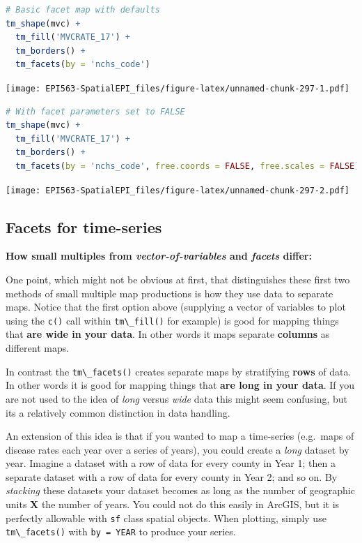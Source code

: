 \documentclass[
]{book}
\newcommand{\passthrough}[1]{#1}
\begin{document}
\begin{lstlisting}[language=R]
# Basic facet map with defaults
tm_shape(mvc) +
  tm_fill('MVCRATE_17') +
  tm_borders() +
  tm_facets(by = 'nchs_code')
\end{lstlisting}

\texttt{[image: EPI563-SpatialEPI\_files/figure-latex/unnamed-chunk-297-1.pdf]}

\begin{lstlisting}[language=R]
# With facet parameters set to FALSE
tm_shape(mvc) +
  tm_fill('MVCRATE_17') +
  tm_borders() +
  tm_facets(by = 'nchs_code', free.coords = FALSE, free.scales = FALSE)
\end{lstlisting}

\texttt{[image: EPI563-SpatialEPI\_files/figure-latex/unnamed-chunk-297-2.pdf]}

\hypertarget{facets-for-time-series}{%
\subsection{Facets for time-series}\label{facets-for-time-series}}

\textbf{How small multiples from \emph{vector-of-variables} and \emph{facets} differ:}

One point, which might not be obvious at first, that distinguishes these first two methods of small multiple map productions is how they use data to separate maps. Notice that the first option above (supplying a vector of variables to plot using the \passthrough{\lstinline!c()!} call within \passthrough{\lstinline!tm\_fill()!} for example) is good for mapping things that \textbf{are wide in your data}. In other words it maps separate \textbf{columns} as different maps.

In contrast the \passthrough{\lstinline!tm\_facets()!} creates separate maps by stratifying \textbf{rows} of data. In other words it is good for mapping things that \textbf{are long in your data}. If you are not used to the idea of \emph{long} versus \emph{wide} data this might seem confusing, but its a relatively common distinction in data handling.

An extension of this idea is that if you wanted to map a time-series (e.g.~maps of disease rates each year over a series of years), you could create a \emph{long} dataset by year. Imagine a dataset with a row of data for every county in Year 1; then a separate dataset with a row of data for every county in Year 2; and so on. By \emph{stacking} these datasets your dataset becomes as long as the number of geographic units \textbf{X} the number of years. You could not do this easily in ArcGIS, but it is perfectly allowable with \passthrough{\lstinline!sf!} class spatial objects. When plotting, simply use \passthrough{\lstinline!tm\_facets()!} with \passthrough{\lstinline!by = YEAR!} to produce your series.
\end{document}
